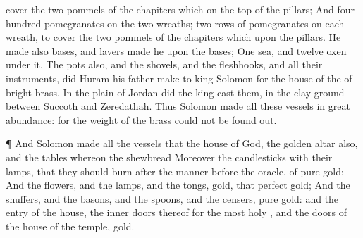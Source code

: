 {cover the
two
pommels of the
chapiters which
{} on the
top of the
pillars;
And
four
hundred
pomegranates on the
two
wreaths;
two
rows of
pomegranates on
each
wreath, to
cover the
two
pommels of the
chapiters which
{}
upon the
pillars.
He
made also
bases, and
lavers
made he upon the
bases;
One
sea, and
twelve
oxen under it.
The
pots also, and the
shovels, and the
fleshhooks, and all their
instruments, did
Huram his
father
make to
king
Solomon for the
house of the
{} of
bright
brass.
In the
plain of
Jordan did the
king
cast them, in the
clay
ground between
Succoth and
Zeredathah.
Thus
Solomon
made all these
vessels in
great
abundance: for the
weight of the
brass could not be found
out.
\par }{\PP {}¶ And
Solomon
made all the
vessels that
{} the
house of
God, the
golden
altar also, and the
tables whereon the
shewbread
{}
Moreover the
candlesticks with their
lamps, that they should
burn after the
manner
before the
oracle, of
pure
gold;
And the
flowers, and the
lamps, and the
tongs,
{}
gold,
{} that
perfect
gold;
And the
snuffers, and the
basons, and the
spoons, and the
censers,
{}
pure
gold: and the
entry of the
house, the
inner
doors thereof for the
most
holy
{}, and the
doors of the
house of the
temple,
{}
gold.

}
